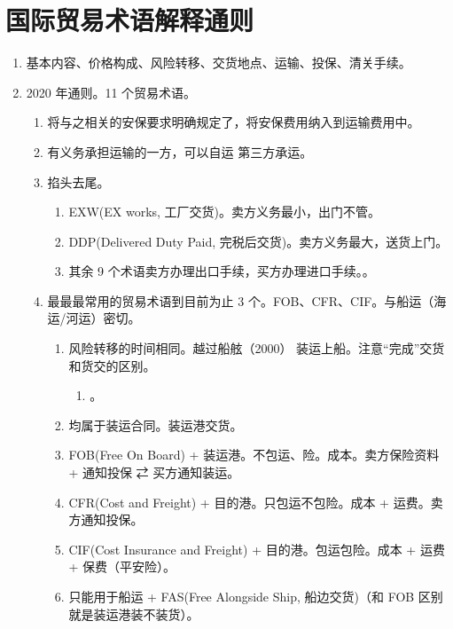 \section{国际贸易术语解释通则}
\begin{enumerate}
  \item 基本内容、价格构成、风险转移、交货地点、运输、投保、清关手续。
  \item 2020 年通则。11 个贸易术语。
        \begin{enumerate}
          \item 将与之相关的安保要求明确规定了，将安保费用纳入到运输费用中。
          \item 有义务承担运输的一方，可以自运 \hz 第三方承运。
          \item 掐头去尾。
                \begin{enumerate}
                  \item EXW(EX works, 工厂交货)。卖方义务最小，出门不管。
                  \item DDP(Delivered Duty Paid, 完税后交货)。卖方义务最大，送货上门。
                  \item 其余 9 个术语卖方办理出口手续，买方办理进口手续。。
                \end{enumerate}
          \item 最最最常用的贸易术语到目前为止 3 个。FOB、CFR、CIF。与船运（海运/河运）密切。
                \begin{enumerate}
                  \item 风险转移的时间相同。越过船舷（2000） \yjt 装运上船。注意“完成”交货和货交的区别。
                        \begin{enumerate}
                          \item {}。
                        \end{enumerate}
                  \item 均属于装运合同。装运港交货。
                  \item FOB(Free On Board) + 装运港。不包运、险。成本。卖方保险资料 + 通知投保 ⇄ 买方通知装运。
                  \item CFR(Cost and Freight) + 目的港。只包运不包险。成本 + 运费。卖方通知投保。
                  \item CIF(Cost Insurance and Freight) + 目的港。包运包险。成本 + 运费 + 保费（平安险）。
                  \item \sjt 只能用于船运 + FAS(Free Alongside Ship, 船边交货)（和 FOB 区别就是装运港装不装货）。

\end{enumerate}
\end{enumerate}
\end{enumerate}
